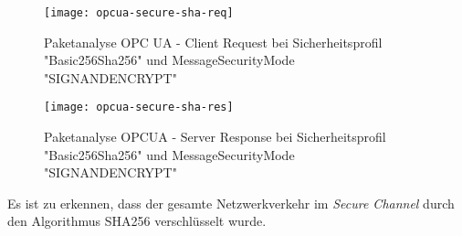 \begin{figure}[h]
  \centering
  \texttt{[image: opcua-secure-sha-req]}
  \caption{Paketanalyse OPC UA - Client Request bei Sicherheitsprofil "Basic256Sha256" und MessageSecurityMode "SIGNANDENCRYPT"} 
  \label{Analyse:opcua-secure-sha-req}
\end{figure}

\begin{figure}[h]
  \centering
  \texttt{[image: opcua-secure-sha-res]}
  \caption{Paketanalyse OPCUA - Server Response bei Sicherheitsprofil "Basic256Sha256" und MessageSecurityMode "SIGNANDENCRYPT"} 
  \label{Analyse:opcua-secure-sha-res}
\end{figure}

\clearpage

Es ist zu erkennen, dass der gesamte Netzwerkverkehr im \textit{Secure Channel} durch den Algorithmus SHA256 verschlüsselt wurde.